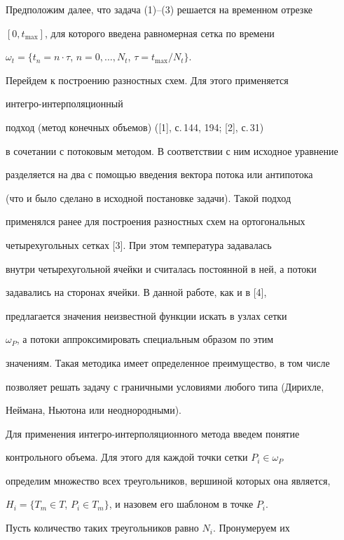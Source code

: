 Предположим далее, что задача (1)--(3) решается на временном отрезке


$[0,t_{\max}]$, для которого введена равномерная сетка по времени


$\omega_t=\{t_n=n\cdot\tau$, $n=0,\dotsc,N_t$, $\tau=t_{\max}/N_t\}$.





Перейдем к построению разностных схем. Для этого применяется


интегро-ин\-тер\-по\-ля\-ци\-он\-ный


подход (метод конечных объемов) ([1], с.\,144, 194; [2], с.\,31)


в сочетании с потоковым методом. В соответствии с ним исходное уравнение


разделяется на два с помощью введения вектора потока или антипотока


(что и было сделано в исходной постановке задачи). Такой подход


применялся ранее для построения разностных схем на ортогональных


четырехугольных сетках [3]. При этом температура задавалась


внутри четырехугольной ячейки и считалась постоянной в ней, а потоки


задавались на сторонах ячейки. В данной работе, как и в [4],


предлагается значения неизвестной функции искать в узлах сетки


$\omega_P$, а потоки аппроксимировать специальным образом по этим


значениям. Такая методика имеет определенное преимущество, в том числе


позволяет решать задачу с граничными условиями любого типа (Дирихле,


Неймана, Ньютона или неоднородными).





Для применения интегро-интерполяционного метода введем понятие


контрольного объема. Для этого для каждой точки сетки $P_i\in\omega_P$


определим множество всех треугольников, вершиной которых она является,


$H_i=\{T_m\in T$, $P_i\in T_m\}$, и назовем его шаблоном в точке $P_i$.


Пусть количество таких треугольников равно $N_i$. Пронумеруем их


